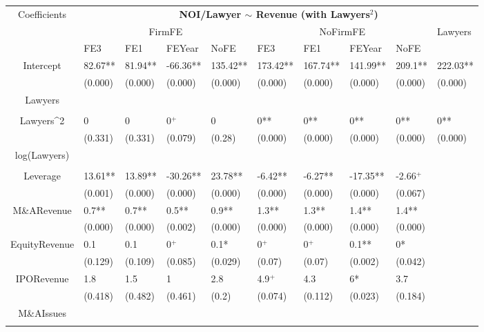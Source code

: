 \documentclass{article}
\begin{document}
\begin{table}[H]
\centering
\begin{tabular}{|clllllllll|}
\hline
\multirow{3}{*}{Coefficients} & \multicolumn{9}{c|}{\textbf{NOI/Lawyer $\sim$ Revenue (with Lawyers$^2$)}} \\
\cline{2-10}
& \multicolumn{4}{c}{FirmFE} & \multicolumn{4}{c}{NoFirmFE} & \multirow{2}{*}{Lawyers} \\
\cline{2-9}
& FE3 & FE1 & FEYear & NoFE & FE3 & FE1 & FEYear & NoFE &  \\
\hline
 
Intercept & 82.67** & 81.94** & -66.36** & 135.42** & 173.42** & 167.74** & 141.99** & 209.1** & 222.03** \\ 
   & (0.000) & (0.000) & (0.000) & (0.000) & (0.000) & (0.000) & (0.000) & (0.000) & (0.000) \\ 
  Lawyers &  &  &  &  &  &  &  &  &  \\ 
   &  &  &  &  &  &  &  &  &  \\ 
  Lawyers^2 & 0 & 0 & 0$^{+}$ & 0 & 0** & 0** & 0** & 0** & 0** \\ 
   & (0.331) & (0.331) & (0.079) & (0.28) & (0.000) & (0.000) & (0.000) & (0.000) & (0.000) \\ 
  log(Lawyers) &  &  &  &  &  &  &  &  &  \\ 
   &  &  &  &  &  &  &  &  &  \\ 
  Leverage & 13.61** & 13.89** & -30.26** & 23.78** & -6.42** & -6.27** & -17.35** & -2.66$^{+}$ &  \\ 
   & (0.001) & (0.000) & (0.000) & (0.000) & (0.000) & (0.000) & (0.000) & (0.067) &  \\ 
  M\&ARevenue & 0.7** & 0.7** & 0.5** & 0.9** & 1.3** & 1.3** & 1.4** & 1.4** &  \\ 
   & (0.000) & (0.000) & (0.002) & (0.000) & (0.000) & (0.000) & (0.000) & (0.000) &  \\ 
  EquityRevenue & 0.1 & 0.1 & 0$^{+}$ & 0.1* & 0$^{+}$ & 0$^{+}$ & 0.1** & 0* &  \\ 
   & (0.129) & (0.109) & (0.085) & (0.029) & (0.07) & (0.07) & (0.002) & (0.042) &  \\ 
  IPORevenue & 1.8 & 1.5 & 1 & 2.8 & 4.9$^{+}$ & 4.3 & 6* & 3.7 &  \\ 
   & (0.418) & (0.482) & (0.461) & (0.2) & (0.074) & (0.112) & (0.023) & (0.184) &  \\ 
  M\&AIssues &  &  &  &  &  &  &  &  &  \\ 
   &  &  &  &  &  &  &  &  &  \\ 

\end{tabular}
\end{table}
\end{document}
